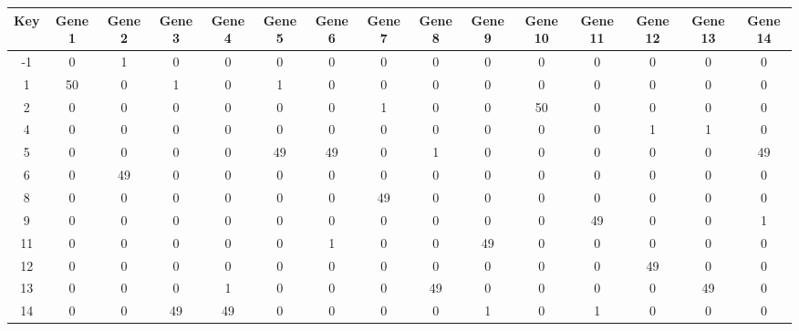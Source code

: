 \begin{tabular}{|c|c|c|c|c|c|c|c|c|c|c|c|c|c|c|}
\hline
Key & Gene 1 & Gene 2 & Gene 3 & Gene 4 & Gene 5 & Gene 6 & Gene 7 & Gene 8 & Gene 9 & Gene 10 & Gene 11 & Gene 12 & Gene 13 & Gene 14 \\
\hline
-1 & 0 & 1 & 0 & 0 & 0 & 0 & 0 & 0 & 0 & 0 & 0 & 0 & 0 & 0 \\
1 & 50 & 0 & 1 & 0 & 1 & 0 & 0 & 0 & 0 & 0 & 0 & 0 & 0 & 0 \\
2 & 0 & 0 & 0 & 0 & 0 & 0 & 1 & 0 & 0 & 50 & 0 & 0 & 0 & 0 \\
4 & 0 & 0 & 0 & 0 & 0 & 0 & 0 & 0 & 0 & 0 & 0 & 1 & 1 & 0 \\
5 & 0 & 0 & 0 & 0 & 49 & 49 & 0 & 1 & 0 & 0 & 0 & 0 & 0 & 49 \\
6 & 0 & 49 & 0 & 0 & 0 & 0 & 0 & 0 & 0 & 0 & 0 & 0 & 0 & 0 \\
8 & 0 & 0 & 0 & 0 & 0 & 0 & 49 & 0 & 0 & 0 & 0 & 0 & 0 & 0 \\
9 & 0 & 0 & 0 & 0 & 0 & 0 & 0 & 0 & 0 & 0 & 49 & 0 & 0 & 1 \\
11 & 0 & 0 & 0 & 0 & 0 & 1 & 0 & 0 & 49 & 0 & 0 & 0 & 0 & 0 \\
12 & 0 & 0 & 0 & 0 & 0 & 0 & 0 & 0 & 0 & 0 & 0 & 49 & 0 & 0 \\
13 & 0 & 0 & 0 & 1 & 0 & 0 & 0 & 49 & 0 & 0 & 0 & 0 & 49 & 0 \\
14 & 0 & 0 & 49 & 49 & 0 & 0 & 0 & 0 & 1 & 0 & 1 & 0 & 0 & 0 \\
\hline
\end{tabular}